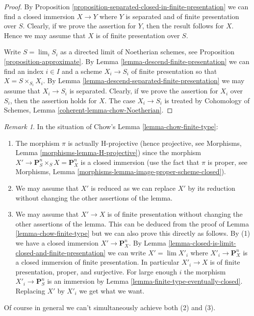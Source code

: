 \documentclass{stacks-project}
\theoremstyle{plain}
\theoremstyle{definition}
\theoremstyle{remark}
\newtheorem{remark}[subsection]{Remark}
\numberwithin{equation}{subsection}
\def\lim{\mathop{\mathrm{lim}}\nolimits}
\begin{document}
\begin{proof}
By Proposition \ref{proposition-separated-closed-in-finite-presentation}
we can find a closed immersion $X \to Y$ where $Y$ is separated
and of finite presentation over $S$. Clearly, if we prove the assertion
for $Y$, then the result follows for $X$. Hence we may assume that
$X$ is of finite presentation over $S$.

\medskip\noindent
Write $S = \lim_i S_i$ as a directed limit of Noetherian schemes, see
Proposition \ref{proposition-approximate}. By
Lemma \ref{lemma-descend-finite-presentation} we can
find an index $i \in I$ and a scheme $X_i \to S_i$ of finite presentation
so that $X = S \times_{S_i} X_i$.
By Lemma \ref{lemma-descend-separated-finite-presentation}
we may assume that $X_i \to S_i$ is separated.
Clearly, if we prove the assertion for
$X_i$ over $S_i$, then the assertion holds for $X$. The case
$X_i \to S_i$ is treated by
Cohomology of Schemes, Lemma \ref{coherent-lemma-chow-Noetherian}.
\end{proof}

\begin{remark}
\label{remark-chow-finite-type}
In the situation of Chow's Lemma \ref{lemma-chow-finite-type}:
\begin{enumerate}
\item The morphism $\pi$ is actually H-projective (hence projective, see
Morphisms, Lemma \ref{morphisms-lemma-H-projective})
since the morphism $X' \to \mathbf{P}^n_S \times_S X = \mathbf{P}^n_X$
is a closed immersion (use the fact that $\pi$ is proper, see
Morphisms, Lemma \ref{morphisms-lemma-image-proper-scheme-closed}).
\item We may assume that $X'$ is reduced as we can replace $X'$ by
its reduction without changing the other assertions of the lemma.
\item We may assume that $X' \to X$ is of finite presentation
without changing the other assertions of the lemma. This can be deduced
from the proof of Lemma \ref{lemma-chow-finite-type} but we can also prove
this directly as follows. By (1) we have a closed immersion
$X' \to \mathbf{P}^n_X$. By
Lemma \ref{lemma-closed-is-limit-closed-and-finite-presentation} we can write
$X' = \lim X'_i$ where $X'_i \to \mathbf{P}^n_X$ is a closed
immersion of finite presentation. In particular $X'_i \to X$ is
of finite presentation, proper, and surjective. For large enough
$i$ the morphism $X'_i \to \mathbf{P}^n_S$ is an immersion by
Lemma \ref{lemma-finite-type-eventually-closed}. Replacing
$X'$ by $X'_i$ we get what we want.
\end{enumerate}
Of course in general we can't simultaneously achieve both (2) and (3).
\end{remark}
\end{document}

